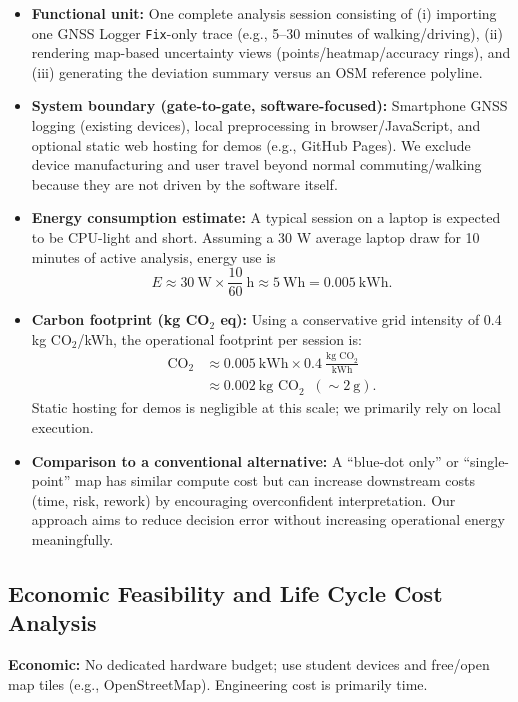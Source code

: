 \documentclass[12pt,a4paper]{article}
\begin{document}
\begin{itemize}[leftmargin=1.5em]
    \item \textbf{Functional unit:} One complete analysis session consisting of (i) importing one GNSS Logger \texttt{Fix}-only trace (e.g., 5--30 minutes of walking/driving), (ii) rendering map-based uncertainty views (points/heatmap/accuracy rings), and (iii) generating the deviation summary versus an OSM reference polyline.
    \item \textbf{System boundary (gate-to-gate, software-focused):} Smartphone GNSS logging (existing devices), local preprocessing in browser/JavaScript, and optional static web hosting for demos (e.g., GitHub Pages). We exclude device manufacturing and user travel beyond normal commuting/walking because they are not driven by the software itself.
    \item \textbf{Energy consumption estimate:} A typical session on a laptop is expected to be CPU-light and short. Assuming a 30 W average laptop draw for 10 minutes of active analysis, energy use is
    \[
      E \approx 30~\text{W} \times \frac{10}{60}~\text{h} \approx 5~\text{Wh} = 0.005~\text{kWh}.
    \]
    \item \textbf{Carbon footprint (kg CO$_2$ eq):} Using a conservative grid intensity of 0.4 kg CO$_2$/kWh, the operational footprint per session is:
    \begin{align*}
      \text{CO}_2 &\approx 0.005~\text{kWh} \times 0.4~\frac{\text{kg CO}_2}{\text{kWh}} \\
                 &\approx 0.002~\text{kg CO}_2 \;\; (\sim 2~\text{g}).
    \end{align*}
    Static hosting for demos is negligible at this scale; we primarily rely on local execution.
    \item \textbf{Comparison to a conventional alternative:} A ``blue-dot only'' or ``single-point'' map has similar compute cost but can increase downstream costs (time, risk, rework) by encouraging overconfident interpretation. Our approach aims to reduce decision error without increasing operational energy meaningfully.
\end{itemize}

\subsection{Economic Feasibility and Life Cycle Cost Analysis}

\noindent\textbf{Economic:} No dedicated hardware budget; use student devices and free/open map tiles (e.g., OpenStreetMap). Engineering cost is primarily time.
\end{document}
